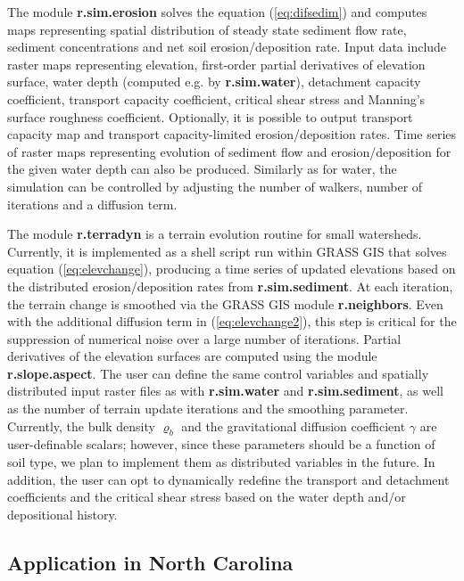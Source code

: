 \documentclass[fleqn,12pt,twoside]{article}
\begin{document}
The module {\bf r.sim.erosion} solves the equation (\ref{eq:difsedim}) and  computes 
maps representing spatial distribution of steady state sediment flow rate,
sediment concentrations and net soil erosion/deposition rate.
Input data include raster maps representing elevation, first-order partial 
derivatives of elevation surface, water depth (computed e.g. by {\bf r.sim.water}), 
detachment capacity coefficient, transport capacity coefficient, critical shear stress and 
Manning's surface roughness coefficient. Optionally, it is possible to output 
transport capacity map and transport capacity-limited erosion/deposition rates.
Time series of raster maps representing evolution of sediment flow and erosion/deposition
for the given water depth can also be produced.
Similarly as for water, the simulation can be controlled by
 adjusting the number of walkers, number of iterations and a diffusion term.

The module {\bf r.terradyn} is a terrain evolution routine
for small watersheds. Currently, it is implemented as a shell script run within GRASS
GIS that solves equation (\ref{eq:elevchange}), producing a time series of updated
elevations based on the distributed erosion/deposition rates from {\bf r.sim.sediment}.
At each iteration, the terrain change is smoothed via the GRASS GIS
module {\bf r.neighbors}.  Even with the
additional diffusion term in (\ref{eq:elevchange2}), this step is critical for
the suppression of numerical noise over a large number of iterations.
Partial derivatives of the elevation surfaces are computed using the module {\bf r.slope.aspect}.
The user can define the same control variables and spatially distributed input raster files
as with {\bf r.sim.water} and {\bf r.sim.sediment}, as well as the number of terrain update
iterations and the smoothing parameter.  Currently, the bulk density $\varrho_b$ and the
gravitational diffusion coefficient $\gamma$ are user-definable scalars; however,
since these parameters should be a function of soil type, we plan to implement them
as distributed variables in the future. In addition, the user can opt to dynamically 
redefine the transport and detachment coefficients and the critical shear stress 
based on the water depth and/or depositional history.

\subsection{Application in North Carolina}
\end{document}
